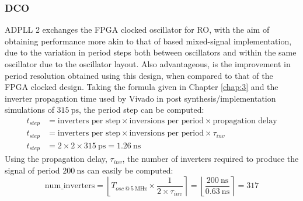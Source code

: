\subsubsection{\acl{DCO}}
\ac{ADPLL} 2 exchanges the \ac{FPGA} clocked oscillator for \ac{RO}, with the aim of obtaining performance more akin to that of  based mixed-signal implementation, due to the variation in period steps both between oscillators and within the same oscillator due to the oscillator layout. Also advantageous, is the improvement in period resolution obtained using this design, when compared to that of the \ac{FPGA} clocked design. Taking the formula given in Chapter \ref{chap:3} and the inverter propagation time used by Vivado in post synthesis/implementation simulations of $315~\si{\pico\second}$, the period step can be computed:
\begin{align}
t_{step} &= \text{inverters per step}\times\text{inversions per period}\times\text{propagation delay} \\
t_{step} &= \text{inverters per step}\times\text{inversions per period}\times\tau_{inv} \\
t_{step} &= 2\times 2\times 315~\si{\pico\second} = 1.26~\si{\nano\second}
\end{align}
Using the propagation delay, $\tau_{inv}$, the number of inverters required to produce the signal of period $200~\si{\nano\second}$ can easily be computed:
\begin{equation}
\text{num\_inverters} = \left \lfloor{ T_{osc~@~5~\si{\mega\hertz}}\times \frac{1}{2\times\tau_{inv}}}\right \rceil = \left \lfloor{ \frac{200~\si{\nano\second}}{0.63~\si{\nano\second}}}\right \rceil = 317
\end{equation}

